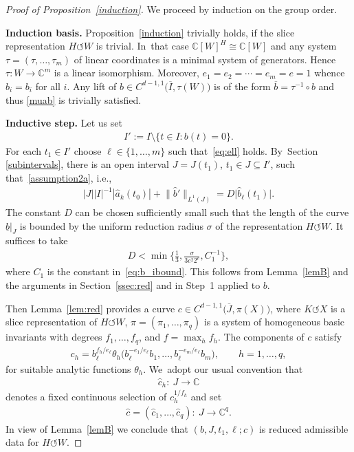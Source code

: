 \documentclass[pdftex]{sigma}
\numberwithin{equation}{section}
\def\th{\theta}
\def\si{\sigma}
\def\ta{\tau}
\def\C{\mathbb{C}}
\def\ol{\overline}
\def\we{\hat}
\renewcommand{\o}{\circ}
\def\acts{\circlearrowleft}
\begin{document}
\begin{proof}[Proof of Proposition~\ref{induction}]
	We proceed by induction on the group order.


\medskip\noindent
{\bf Induction basis.}
Proposition~\ref{induction} trivially holds, if the slice representation $H \acts W$
is trivial. In~that case $\C[W]^H \cong \C[W]$ and any system $\ta = (\ta,\dots,\ta_m)$ of linear coordinates
is a minimal system of generators. Hence $\ta \colon W \to \C^m$ is a linear isomorphism.
Moreover, $e_1 = e_2 = \cdots = e_m = e =1$ whence $\we b_i = b_i$ for all $i$.
Any lift of $b \in C^{d-1,1}\big(\ol I,\ta(W)\big)$ is of the form $\ol b = \ta^{-1} \o b$ and thus
\eqref{muab} is trivially satisfied.

\medskip\noindent
{\bf Inductive step.}
Let us set
\begin{gather*}
 I' := I \setminus \{t \in I \colon b(t) = 0\}.
\end{gather*}
For each $t_1 \in I'$ choose $\ell \in \{1, \dots, m\}$ such that~\eqref{eq:ell} holds. By~Section \ref{subintervals}, there is an open interval $J = J(t_1)$, $t_1 \in J \subseteq I'$,
such that~\eqref{assumption2a}, i.e.,
\begin{gather*}
 | J| |I|^{-1} {|\we a_k(t_0)|}
 + \big\|\we b'\big\|_{L^1 (J)} = D \big|\we b_\ell(t_1)\big| .
\end{gather*}
The constant $D$
can be chosen sufficiently small such that the length of the curve $\underline b|_J$ is bounded by
the uniform reduction radius $\si$ of the representation $H \acts W$.
It suffices to take
\begin{gather} \label{D}
 D < \min\bigg\{\frac 1 3, \frac{\si}{3 e^2 2^{e}}, C_1^{-1}\bigg\},
\end{gather}
where $C_1$ is the constant in~\eqref{eq:b_ibound}.
This follows from Lemma~\ref{lemB}
and the arguments in Section~\ref{ssec:red} and in Step~1 applied to $b$.

Then Lemma~\ref{lem:red} provides a curve $c \in C^{d-1,1}\big(\ol J, \pi(X)\big)$, where $K \acts X$ is a slice representation
of $H \acts W$, $\pi = (\pi_1,\dots,\pi_q)$ is a system of homogeneous basic invariants with degrees $f_1,\dots,f_q$,
and $f = \max_h f_h$.
The components of $c$ satisfy
\begin{gather*} %
 c_h = b_\ell^{f_h/e_\ell} \th_h \big(b_\ell^{-e_1/e_\ell} b_1, \dots, b_\ell^{-e_m/e_\ell} b_m\big), \qquad h = 1,\dots,q,
\end{gather*}
for suitable analytic functions $\th_h$. We~adopt our usual convention that
\begin{gather*}
\we c_h \colon\ J \to \C
\end{gather*}
denotes a fixed continuous selection of $c_h ^{1/f_h}$ and
set
\begin{gather*}
	\we c = (\we c_1 ,\dots,\we c_q) \colon\ J \to \C^q.
\end{gather*}
In view of Lemma~\ref{lemB} we conclude that $(b,J,t_1,\ell; c)$ is reduced admissible data for $H \acts W$.








\end{proof}
\end{document}
